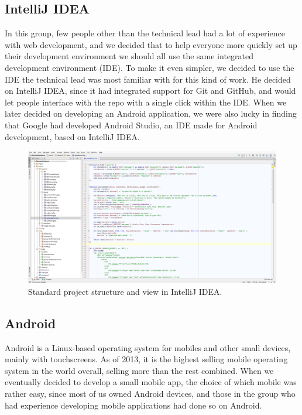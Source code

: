 \subsection{IntelliJ IDEA}
\label{subsec:PlanningSoftwareDevIntelliJ}

In this group, few people other than the technical lead had a lot of experience with web development, and we decided that to help everyone more quickly set up their development environment we should all use the same integrated development environment (IDE). To make it even simpler, we decided to use the IDE the technical lead was most familiar with for this kind of work. He decided on IntelliJ IDEA, since it had integrated support for Git and GitHub, and would let people interface with the repo with a single click within the IDE. When we later decided on developing an Android application, we were also lucky in finding that Google had developed Android Studio, an IDE made for Android development, based on IntelliJ IDEA.

\begin{figure}[ht!]
  \centering
  \includegraphics[width=\linewidth]{./Planning/img/IntelliJ}
  \caption{Standard project structure and view in IntelliJ IDEA.}
  \label{fig:PlanningSoftwareDevIntelliJView}
\end{figure}

\subsection{Android}
\label{subsec:PlanningSoftwareDevAndroid}

Android is a Linux-based operating system for mobiles and other small devices, mainly with touchscreens. As of 2013, it is the highest selling mobile operating system in the world overall, selling more than the rest combined. When we eventually decided to develop a small mobile app, the choice of which mobile was rather easy, since most of us owned Android devices, and those in the group who had experience developing mobile applications had done so on Android.

